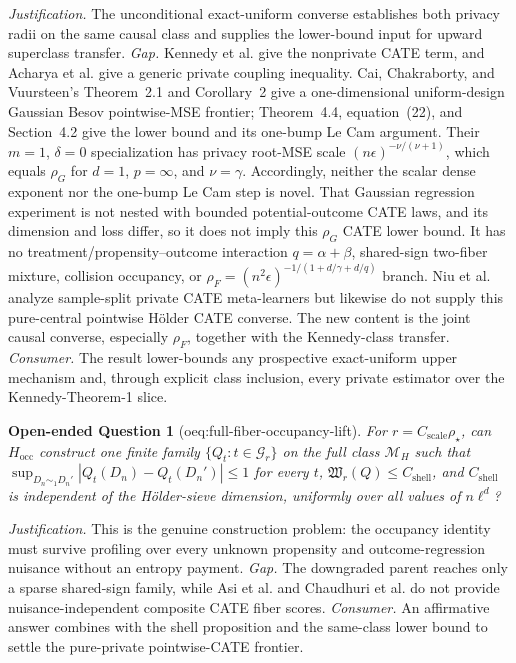 \documentclass{article}
\newtheorem{openendedquestion}{Open-ended Question}
\begin{document}
\par\smallskip\noindent \textit{Justification.} The unconditional exact-uniform converse establishes both privacy radii on the same causal class and supplies the lower-bound input for upward superclass transfer. \textit{Gap.} Kennedy et al. give the nonprivate CATE term, and Acharya et al. give a generic private coupling inequality.  Cai, Chakraborty, and Vuursteen's Theorem~2.1 and Corollary~2 give a one-dimensional uniform-design Gaussian Besov pointwise-MSE frontier; Theorem~4.4, equation~(22), and Section~4.2 give the lower bound and its one-bump Le Cam argument.  Their \(m=1\), \(\delta=0\) specialization has privacy root-MSE scale \((n\epsilon)^{-\nu/(\nu+1)}\), which equals \(\rho_G\) for \(d=1\), \(p=\infty\), and \(\nu=\gamma\).  Accordingly, neither the scalar dense exponent nor the one-bump Le Cam step is novel.  That Gaussian regression experiment is not nested with bounded potential-outcome CATE laws, and its dimension and loss differ, so it does not imply this \(\rho_G\) CATE lower bound.  It has no treatment/propensity--outcome interaction \(q=\alpha+\beta\), shared-sign two-fiber mixture, collision occupancy, or \(\rho_F=(n^2\epsilon)^{-1/(1+d/\gamma+d/q)}\) branch.  Niu et al. analyze sample-split private CATE meta-learners but likewise do not supply this pure-central pointwise Hölder CATE converse.  The new content is the joint causal converse, especially \(\rho_F\), together with the Kennedy-class transfer. \textit{Consumer.} The result lower-bounds any prospective exact-uniform upper mechanism and, through explicit class inclusion, every private estimator over the Kennedy-Theorem-1 slice.

\begin{openendedquestion}[oeq:full-fiber-occupancy-lift]\label{oeq:full-fiber-occupancy-lift}
For \(r=C_{\mathrm{scale}}\rho_\star\), can \(H_{\mathrm{occ}}\) construct one finite family \(\{Q_t:t\in\mathcal G_r\}\) on the full class \(\mathcal M_H\) such that \(\sup_{D_n\sim_1D_n'}|Q_t(D_n)-Q_t(D_n')|\le1\) for every \(t\), \(\mathfrak W_r(Q)\le C_{\mathrm{shell}}\), and \(C_{\mathrm{shell}}\) is independent of the Hölder-sieve dimension, uniformly over all values of \(n\ell^d\)?
\end{openendedquestion}
\par\smallskip\noindent \textit{Justification.} This is the genuine construction problem: the occupancy identity must survive profiling over every unknown propensity and outcome-regression nuisance without an entropy payment. \textit{Gap.} The downgraded parent reaches only a sparse shared-sign family, while Asi et al. and Chaudhuri et al. do not provide nuisance-independent composite CATE fiber scores. \textit{Consumer.} An affirmative answer combines with the shell proposition and the same-class lower bound to settle the pure-private pointwise-CATE frontier.
\end{document}
